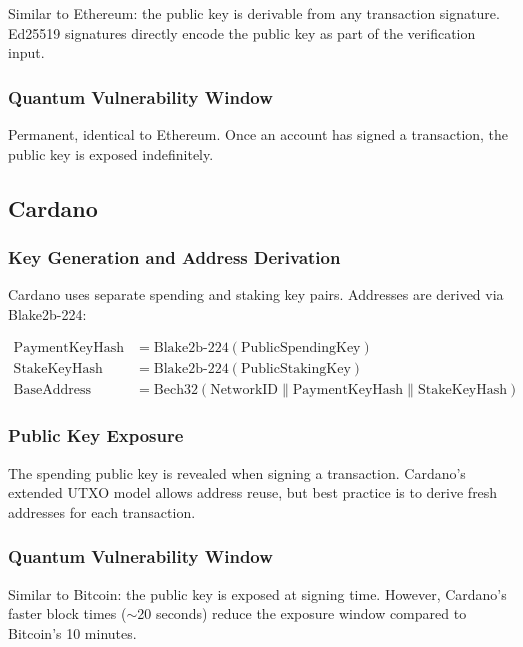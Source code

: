 \documentclass[11pt,a4paper]{article}
\begin{document}
Similar to Ethereum: the public key is derivable from any transaction
signature. Ed25519 signatures directly encode the public key as part
of the verification input.

\subsubsection{Quantum Vulnerability Window}

Permanent, identical to Ethereum. Once an account has signed a
transaction, the public key is exposed indefinitely.

\subsection{Cardano}

\subsubsection{Key Generation and Address Derivation}

Cardano uses separate spending and staking key pairs. Addresses are
derived via Blake2b-224:

\begin{align*}
\text{PaymentKeyHash} &= \text{Blake2b-224}(\text{PublicSpendingKey}) \\
\text{StakeKeyHash} &= \text{Blake2b-224}(\text{PublicStakingKey}) \\
\text{BaseAddress} &= \text{Bech32}(\text{NetworkID} \|
  \text{PaymentKeyHash} \| \text{StakeKeyHash})
\end{align*}

\subsubsection{Public Key Exposure}

The spending public key is revealed when signing a transaction.
Cardano's extended UTXO model allows address reuse, but best practice
is to derive fresh addresses for each transaction.

\subsubsection{Quantum Vulnerability Window}

Similar to Bitcoin: the public key is exposed at signing time. However,
Cardano's faster block times ($\sim$20 seconds) reduce the exposure
window compared to Bitcoin's 10 minutes.
\end{document}
